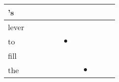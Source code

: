 \documentclass[landscape]{article}
\newcommand{\ssp}{\hspace{2pt}}
\newcommand{\mex}{\cellcolor{g}$\bullet$}
\begin{document}
\begin{tabular}{|l|p{10pt}|p{10pt}|p{10pt}|p{10pt}|p{10pt}|p{10pt}|p{10pt}|p{10pt}|p{10pt}|p{10pt}|}
\hline
\ssp 's \ssp&\hspace{2pt}&\hspace{2pt}&\hspace{2pt}&\hspace{2pt}&\hspace{2pt}&\hspace{2pt}&\hspace{2pt}&\hspace{2pt}&\hspace{2pt}&\hspace{2pt}\\
\hline
\ssp lever \ssp&\hspace{2pt}&\hspace{2pt}&\hspace{2pt}&\hspace{2pt}&\hspace{2pt}&\hspace{2pt}&\hspace{2pt}&\hspace{2pt}&\hspace{2pt}&\hspace{2pt}\\
\hline
\ssp \cellcolor{ref4}to \ssp&\hspace{2pt}&\hspace{2pt}&\hspace{2pt}&\hspace{2pt}&\hspace{2pt}\mex&\hspace{2pt}&\hspace{2pt}&\hspace{2pt}&\hspace{2pt}&\hspace{2pt}\\
\hline
\ssp fill \ssp&\hspace{2pt}&\hspace{2pt}&\hspace{2pt}&\hspace{2pt}&\hspace{2pt}&\hspace{2pt}&\hspace{2pt}&\hspace{2pt}&\hspace{2pt}&\hspace{2pt}\\
\hline
\ssp \cellcolor{ref6}the \ssp&\hspace{2pt}&\hspace{2pt}&\hspace{2pt}&\hspace{2pt}&\hspace{2pt}&\hspace{2pt}&\hspace{2pt}\mex&\hspace{2pt}&\hspace{2pt}&\hspace{2pt}\\

\end{tabular}
\end{document}
